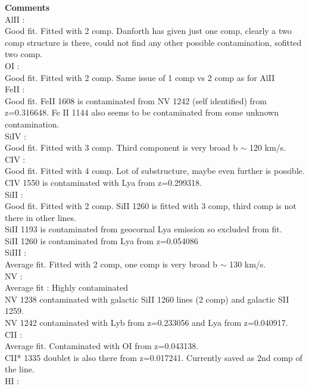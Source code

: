 \documentclass[12pt]{report}
\begin{document}
 
\textbf{Comments}  \\


AlII :  \\  \hspace*{1.5cm}
        Good fit. Fitted with 2 comp. Danforth has given just one comp, clearly a two comp structure is there, could not find any other possible contamination, sofitted two comp.  \\

OI :  \\  \hspace*{1.5cm} 
        Good fit. Fitted with 2 comp. Same issue of 1 comp vs 2 comp as for AlII  \\

FeII :  \\  \hspace*{1.5cm}
        Good fit. FeII 1608 is contaminated from NV 1242 (self identified) from z=0.316648. Fe II 1144 also seems to be contaminated from some unknown contamination.  \\

SiIV :  \\  \hspace*{1.5cm}
        Good fit. Fitted with 3 comp. Third component is very broad b $\sim$ 120 km/s.  \\

CIV :  \\  \hspace*{1.5cm}
        Good fit. Fitted with 4 comp. Lot of substructure, maybe even further is possible. CIV 1550 is contaminated with Lya from z=0.299318.  \\

SiII :  \\  \hspace*{1.5cm}
        Good fit. Fitted with 2 comp. SiII 1260 is fitted with 3 comp, third comp is not there in other lines.  \\
        SiII 1193 is contaminated from geocornal Lya emission so excluded from fit. \\
        SiII 1260 is contaminated from Lya from z=0.054086 \\

SiIII :  \\  \hspace*{1.5cm}
        Average fit. Fitted with 2 comp, one comp is very broad b $\sim$ 130 km/s. \\

NV :  \\  \hspace*{1.5cm}
        Average fit  :  Highly contaminated  \\
        NV 1238 contaminated with galactic SiII 1260 lines (2 comp) and galactic SII 1259.  \\
        NV 1242 contaminated with Lyb from z=0.233056 and Lya from z=0.040917.  \\

CII :  \\  \hspace*{1.5cm}
        Average fit. Contaminated with OI from z=0.043138.   \\
        CII* 1335 doublet is also there from z=0.017241. Currently saved as 2nd comp of the line.  \\

HI :  \\  \hspace*{1.5cm}
\end{document}
